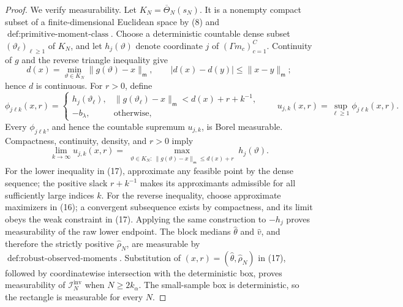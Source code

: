 \documentclass{article}
\begin{document}
\begin{proof}
We verify measurability.  Let \(K_N=\overline\Theta_N(s_N)\).  It is a nonempty compact subset of a finite-dimensional Euclidean space by (8) and \(\operatorname{def:primitive\text{-}moment\text{-}class}\).  Choose a deterministic countable dense subset \((\vartheta_\ell)_{\ell\geq1}\) of \(K_N\), and let \(h_j(\vartheta)\) denote coordinate \(j\) of \((\Gamma m_c)_{c=1}^C\).  Continuity of \(g\) and the reverse triangle inequality give
\[
 d(x)=\min_{\vartheta\in K_N}\|g(\vartheta)-x\|_{\mathsf m},
 \qquad
 |d(x)-d(y)|\leq\|x-y\|_{\mathsf m};
 \tag{15}
\]
hence \(d\) is continuous.  For \(r>0\), define
\[
 \phi_{j\ell k}(x,r)=
 \begin{cases}
 h_j(\vartheta_\ell),&
 \|g(\vartheta_\ell)-x\|_{\mathsf m}<d(x)+r+k^{-1},\\
 -b_\lambda,&\text{otherwise},
 \end{cases}
 \qquad
 u_{j,k}(x,r)=\sup_{\ell\geq1}\phi_{j\ell k}(x,r).
 \tag{16}
\]
Every \(\phi_{j\ell k}\), and hence the countable supremum \(u_{j,k}\), is Borel measurable.  Compactness, continuity, density, and \(r>0\) imply
\[
 \lim_{k\to\infty}u_{j,k}(x,r)
 =\max_{\substack{\vartheta\in K_N:\ 
 \|g(\vartheta)-x\|_{\mathsf m}\leq d(x)+r}}
 h_j(\vartheta).
 \tag{17}
\]
For the lower inequality in (17), approximate any feasible point by the dense sequence; the positive slack \(r+k^{-1}\) makes its approximants admissible for all sufficiently large indices \(k\).  For the reverse inequality, choose approximate maximizers in (16); a convergent subsequence exists by compactness, and its limit obeys the weak constraint in (17).  Applying the same construction to \(-h_j\) proves measurability of the raw lower endpoint.  The block medians \(\widehat\theta\) and \(\widehat v\), and therefore the strictly positive \(\widehat\rho_N\), are measurable by \(\operatorname{def:robust\text{-}observed\text{-}moments}\).  Substitution of \((x,r)=(\widehat\theta,\widehat\rho_N)\) in (17), followed by coordinatewise intersection with the deterministic box, proves measurability of \(\mathcal I_N^{\mathrm{inv}}\) when \(N\geq2k_\alpha\).  The small-sample box is deterministic, so the rectangle is measurable for every \(N\).


\end{proof}
\end{document}
